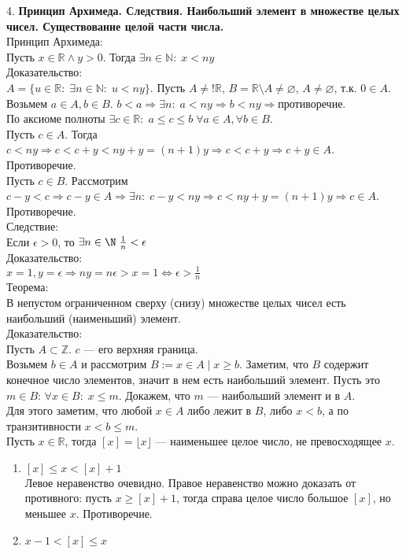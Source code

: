 \documentclass[12pt]{article}
\begin{document}
4. \textbf{Принцип Архимеда. Следствия. Наибольший элемент в множестве целых чисел. Существование целой части числа.}\\
Принцип Архимеда:\\
Пусть $x \in \mathbb{R} \land y > 0$. Тогда  $\exists n \in \mathbb{N}:\; x < ny$\\
Доказательство:\\
$A = \{u \in \mathbb{R}:\; \exists n \in \mathbb{N}:\; u < ny\}$. Пусть $A \neq! \mathbb{R}$, $B = \mathbb{R} \setminus A \neq \varnothing$,  $A \neq \varnothing$, т.к.  $0 \in A$.\\
Возьмем  $a \in A, b \in B$.  $b < a \Rightarrow \exists n: \; a < ny \Rightarrow b < ny \Rightarrow \texttt{противоречие}$. \\
По аксиоме полноты $\exists c \in \mathbb{R}: \; a \le c \le b \; \forall a \in A, \forall b \in B$.\\
Пусть $c \in A$. Тогда  $c < ny \Rightarrow c < c + y < ny + y = (n+1)y \Rightarrow c < c + y \Rightarrow c + y \in A$. Противоречие.\\
Пусть  $c \in B$.  Рассмотрим $c-y<c \Rightarrow c-y \in A \Rightarrow \exists n: \; c - y < ny \Rightarrow c < ny + y = (n+1)y \Rightarrow c \in A$. Противоречие.\\

Следствие:\\
Если $\epsilon > 0$, то $\exists n \in \N \; \frac{1}{n} < \epsilon$\\
Доказательство:\\
$x = 1, y = \epsilon \Rightarrow ny = n \epsilon > x = 1 \iff \epsilon > \frac{1}{n}$\\

Теорема:\\
В непустом ограниченном сверху (снизу) множестве целых чисел есть наибольший (наименьший) элемент.\\
Доказательство:\\
Пусть $A \subset \mathbb{Z}$.  $c$ --- его верхняя граница.\\
Возьмем  $b \in A$ и рассмотрим  $B := {x \in A \mid x \ge b}$. Заметим, что $B$ содержит конечное число элементов, значит в нем есть наибольший элемент. Пусть это $m \in B$:  $\forall x \in B:\; x \le m$. Докажем, что $m$ --- наибольший элемент и в  $A$.\\
Для этого заметим, что любой $x \in A$ либо лежит в $B$, либо  $x < b$, а по транзитивности  $x < b \le m$.\\

Пусть $x \in \mathbb{R}$, тогда  $[x] = \lfloor x \rfloor$ --- наименьшее целое число, не превосходящее  $x$.
\begin{enumerate}
    \item $[x]  \le x < [x] + 1$\\
        Левое неравенство очевидно. Правое неравенство можно доказать от противного: пусть $x \ge [x] + 1$, тогда справа целое число большое $[x]$, но меньшее  $x$. Противоречие.
    \item $x - 1 < [x] \le x$
\end{enumerate}
\end{document}

